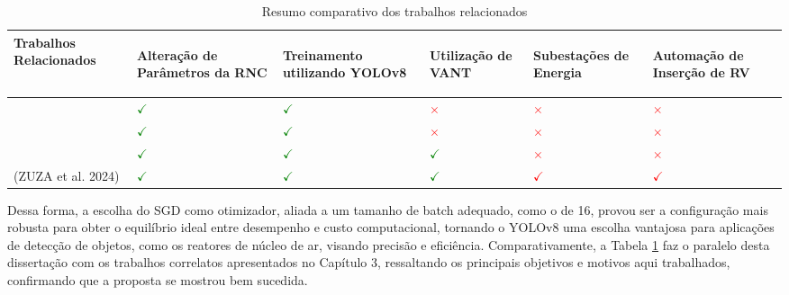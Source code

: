 \begin{table}[!hbt]
    \centering
    \caption{Resumo comparativo dos trabalhos relacionados}
    \begin{tabular}{ >{\centering\arraybackslash}m{5cm} | >{\centering\arraybackslash}m{2cm} | >{\centering\arraybackslash}m{2cm} | >{\centering\arraybackslash}m{2cm} | >{\centering\arraybackslash}m{2cm} | >{\centering\arraybackslash}m{2cm} }
    \hline
    \cellcolor[gray]{0.9} \textbf{Trabalhos Relacionados} & 
    \cellcolor[gray]{0.9} \begin{sideways} \textbf{Alteração de Parâmetros da RNC} \end{sideways} & 
    \cellcolor[gray]{0.9} \begin{sideways} \textbf{Treinamento utilizando YOLOv8} \end{sideways} & 
    \cellcolor[gray]{0.9} \begin{sideways} \textbf{Utilização de VANT} \end{sideways} & 
    \cellcolor[gray]{0.9} \begin{sideways} \textbf{Subestações de Energia} \end{sideways} &
    \cellcolor[gray]{0.9} \begin{sideways} \textbf{Automação de Inserção de RV} \end{sideways} \\
    \hline 
    \cite{gonzaga2023identificaccao} & \textcolor{green}{\(\checkmark\)} & \textcolor{green}{\(\checkmark\)} & \textcolor{red}{\(\times\)} & \textcolor{red}{\(\times\)} & \textcolor{red}{\(\times\)} \\
    \hline
    \cite{diascomparaccao} & \textcolor{green}{\(\checkmark\)} & \textcolor{green}{\(\checkmark\)} & \textcolor{red}{\(\times\)} & \textcolor{red}{\(\times\)} & \textcolor{red}{\(\times\)} \\
    \hline
    \cite{wang2023uav} & \textcolor{green}{\(\checkmark\)} & \textcolor{green}{\(\checkmark\)} & \textcolor{green}{\(\checkmark\)} & \textcolor{red}{\(\times\)} & \textcolor{red}{\(\times\)} \\
    \hline
    (ZUZA et al. 2024) & \textcolor{green}{\(\checkmark\)} & \textcolor{green}{\(\checkmark\)} & \textcolor{green}{\(\checkmark\)} & \textcolor{red}{\(\checkmark\)} & \textcolor{red}{\(\checkmark\)} \\
    \end{tabular}
    \label{tab:relacionadoZuza}
\end{table}

Dessa forma, a escolha do SGD como otimizador, aliada a um tamanho de batch adequado, como o de 16, provou ser a configuração mais robusta para obter o equilíbrio ideal entre desempenho e custo computacional, tornando o YOLOv8 uma escolha vantajosa para aplicações de detecção de objetos, como os reatores de núcleo de ar, visando precisão e eficiência. Comparativamente, a Tabela \ref{tab:relacionadoZuza} faz o paralelo desta dissertação com os trabalhos correlatos apresentados no Capítulo 3, ressaltando os principais objetivos e motivos aqui trabalhados, confirmando que a proposta se mostrou bem sucedida.


